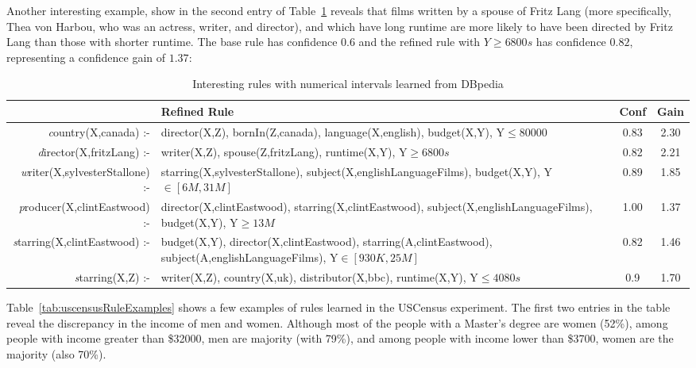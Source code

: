 Another interesting example, show  in the second entry of Table~\ref{tab:mdbRuleExamples} reveals that films written by
a spouse of Fritz Lang (more specifically, Thea von Harbou, who was an actress, writer, and director), and which have
long runtime are more likely to have been directed by Fritz Lang than those with shorter runtime. The base rule has
confidence $0.6$ and the refined rule with $Y\geq 6800s$ has confidence $0.82$, representing a confidence gain of
$1.37$:

\begin{table}[h!]
 \begin{center}
 \caption{Interesting rules with numerical intervals learned from DBpedia}
  \begin{tabular}{ >{\emph}r >{\raggedright}p{7cm} | c | c }
    \toprule
      & Refined Rule				& Conf 	& Gain \\
    \midrule
      country(X,canada) :-&director(X,Z), bornIn(Z,canada), language(X,english), budget(X,Y), Y$\leq 80000$ &
      0.83	& 2.30 \\ \hline
      director(X,fritzLang) :-&writer(X,Z), spouse(Z,fritzLang), runtime(X,Y), Y$\geq 6800s$ & 
      0.82	& 2.21 \\ \hline
      writer(X,sylvesterStallone) :-&starring(X,sylvesterStallone), subject(X,englishLanguageFilms),
      budget(X,Y), Y$\in [6M,31M]$ &
      0.89	& 1.85 \\ \hline
      producer(X,clintEastwood) :-&director(X,clintEastwood), starring(X,clintEastwood),
      subject(X,englishLanguageFilms), budget(X,Y), Y$\geq 13M$ &
      1.00	& 1.37 \\ \hline
      starring(X,clintEastwood) :- &budget(X,Y), director(X,clintEastwood), starring(A,clintEastwood), 
      subject(A,englishLanguageFilms), Y$\in [930K,25M]$&
      0.82	& 1.46 \\ \hline
      starring(X,Z) :-&writer(X,Z), country(X,uk), distributor(X,bbc), runtime(X,Y), Y$\leq 4080s$ &
      0.9	& 1.70 \\

    \bottomrule
  \end{tabular}
  \label{tab:mdbRuleExamples}
 \end{center}
\end{table}

Table~\ref{tab:uscensusRuleExamples} shows a few examples of rules learned in the USCensus experiment. The first two
entries in the table reveal the discrepancy in the income of men and women. Although most of the people
with a Master's degree are women (52\%), among people with income greater than \$32000, men are majority (with 79\%),
and among people with income lower than \$3700, women are the majority (also 70\%).

